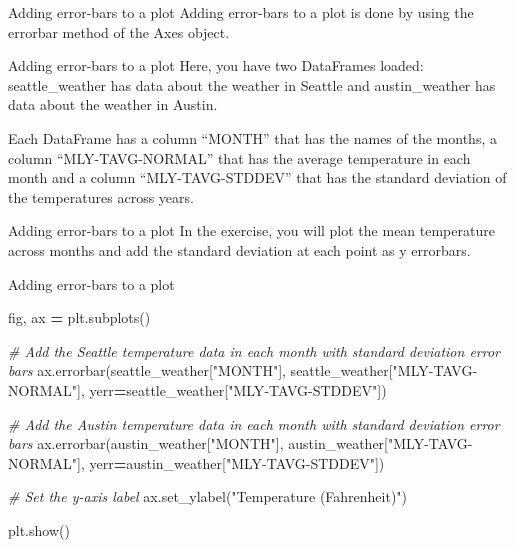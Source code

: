 \documentclass[
  ignorenonframetext,
]{beamer}
\newenvironment{Shaded}{\begin{snugshade}}{\end{snugshade}}
\newcommand{\CommentTok}[1]{\textcolor[rgb]{0.56,0.35,0.01}{\textit{#1}}}
\newcommand{\NormalTok}[1]{#1}
\newcommand{\OperatorTok}[1]{\textcolor[rgb]{0.81,0.36,0.00}{\textbf{#1}}}
\newcommand{\StringTok}[1]{\textcolor[rgb]{0.31,0.60,0.02}{#1}}
\begin{document}
\begin{frame}{Adding error-bars to a plot}
\label{adding-error-bars-to-a-plot}
Adding error-bars to a plot is done by using the errorbar method of the
Axes object.
\end{frame}

\begin{frame}{Adding error-bars to a plot}
\label{adding-error-bars-to-a-plot-1}
Here, you have two DataFrames loaded: seattle\_weather has data about
the weather in Seattle and austin\_weather has data about the weather in
Austin.

Each DataFrame has a column ``MONTH'' that has the names of the months,
a column ``MLY-TAVG-NORMAL'' that has the average temperature in each
month and a column ``MLY-TAVG-STDDEV'' that has the standard deviation
of the temperatures across years.
\end{frame}

\begin{frame}{Adding error-bars to a plot}
\label{adding-error-bars-to-a-plot-2}
In the exercise, you will plot the mean temperature across months and
add the standard deviation at each point as y errorbars.
\end{frame}

\begin{frame}[fragile]{Adding error-bars to a plot}
\label{adding-error-bars-to-a-plot-3}

\begin{Shaded}
\begin{Highlighting}[]
\NormalTok{fig, ax }\OperatorTok{=}\NormalTok{ plt.subplots()}

\CommentTok{\# Add the Seattle temperature data in each month with standard deviation error bars}
\NormalTok{ax.errorbar(seattle\_weather[}\StringTok{"MONTH"}\NormalTok{], seattle\_weather[}\StringTok{"MLY{-}TAVG{-}NORMAL"}\NormalTok{], yerr}\OperatorTok{=}\NormalTok{seattle\_weather[}\StringTok{"MLY{-}TAVG{-}STDDEV"}\NormalTok{])}

\CommentTok{\# Add the Austin temperature data in each month with standard deviation error bars}
\NormalTok{ax.errorbar(austin\_weather[}\StringTok{"MONTH"}\NormalTok{], austin\_weather[}\StringTok{"MLY{-}TAVG{-}NORMAL"}\NormalTok{], yerr}\OperatorTok{=}\NormalTok{austin\_weather[}\StringTok{"MLY{-}TAVG{-}STDDEV"}\NormalTok{])}

\CommentTok{\# Set the y{-}axis label}
\NormalTok{ax.set\_ylabel(}\StringTok{"Temperature (Fahrenheit)"}\NormalTok{)}

\NormalTok{plt.show()}
\end{Highlighting}
\end{Shaded}
\end{frame}
\end{document}
